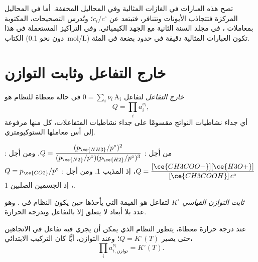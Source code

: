 \begin{remark}\label{rem:b1:extent-q-and-k:ideal}
تصح هذه العبارات في الغازات المثالية وفي المحاليل المخففة. أما في
المحاليل المركزة فتتجاذب الأيونات وتتنافر، فتبتعد
 عن $c_i/c^\circ$؛ وتُدرس التصحيحات، المكتوبة بمعاملات
، في مجلد السنة الثانية مع الجهد
الكيميائي. وفي التراكيز المستعملة في هذا الكتاب (دون نحو
\qty{0.1}{mol/L}) تكون العبارات المثالية دقيقة في حدود بضعة في المئة.
\end{remark}

\section{خارج التفاعل وثابت التوازن}

\begin{definition}\label{def:b1:extent-q-and-k:quotient}
\emph{خارج التفاعل} لتفاعل
$0 = \sum_i \nu_i\,\mathrm{A}_i$ في حالة معطاة للنظام هو
\[
  Q = \prod_i a_i^{\nu_i} ,
\]
أي جداء نشاطيات النواتج مقسومًا على جداء نشاطيات
المتفاعلات، كل منها مرفوعة إلى أس معاملها الستوكيومتري.
\end{definition}

\begin{example}\label{ex:b1:extent-q-and-k:quotients}
من أجل : $Q = \dfrac{(p_{\ce{NH3}}/p^\circ)^2}
{(p_{\ce{N2}}/p^\circ)(p_{\ce{H2}}/p^\circ)^3}$. ومن أجل
: $Q =
\dfrac{[\ce{CH3COO-}][\ce{H3O+}]}{[\ce{CH3COOH}]\,c^\circ}$، إذ 
المذيب 1. ومن أجل : $Q =
p_{\ce{CO2}}/p^\circ$، إذ  الجسمين الصلبين 1.
\end{example}

\begin{definition}\label{def:b1:extent-q-and-k:equilibrium-constant}
\emph{ثابت التوازن القياسي}
$K^\circ$ لتفاعل هو القيمة التي يأخذها  حين يكون النظام في . وهو عدد بلا أبعاد
لا يتعلق إلا بالتفاعل وبدرجة الحرارة.
\end{definition}

\begin{theorem}\label{thm:b1:extent-q-and-k:mass-action}
عند درجة حرارة معطاة، يتطور النظام الذي يمكن أن يجري فيه تفاعل في
الاتجاهين حتى يصير $Q = K^\circ(T)$؛ وعند التوازن، أيًّا كان
التركيب الابتدائي،
\[
  \prod_i a_{i,\text{توازن}}^{\nu_i} = K^\circ(T) .
\]
\end{theorem}
\admitted

